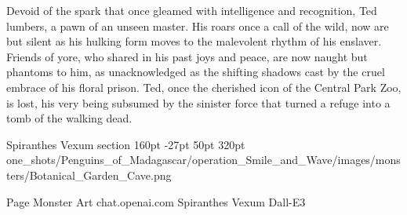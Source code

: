Devoid of the spark that once gleamed with intelligence and recognition, Ted lumbers, a pawn of an unseen master. His roars once a call of the wild, now are but silent as his hulking form moves to the malevolent rhythm of his enslaver. Friends of yore, who shared in his past joys and peace, are now naught but phantoms to him, as unacknowledged as the shifting shadows cast by the cruel embrace of his floral prison. Ted, once the cherished icon of the Central Park Zoo, is lost, his very being subsumed by the sinister force that turned a refuge into a tomb of the walking dead.

\hfill

\def\primarycolor{titlered}%
\def\secondarycolor{white}%
\MonsterBannerGraphic%
	{Spiranthes Vexum} %
	{section} %
	{160pt} %
	{-27pt} %
	{50pt} %
	{320pt} %
	{\PATH one_shots/Penguins_of_Madagascar/operation_Smile_and_Wave/images/monsters/Botanical_Garden_Cave.png} %
	{} %
\label{sec:SpiranthesVexum}
%

%
	{Page \thepage}%
	{Monster Art}%
	{chat.openai.com}%
	{Spiranthes Vexum}%
	{Dall-E3}%

